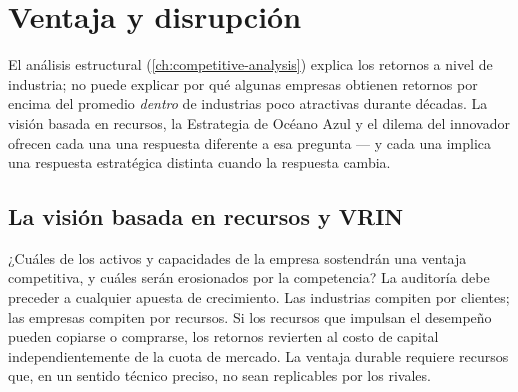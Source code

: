 \chapter{Ventaja y disrupción}\label{ch:advantage-and-disruption}


El análisis estructural (\cref{ch:competitive-analysis}) explica los retornos a nivel de industria;
no puede explicar por qué algunas empresas obtienen retornos por encima del promedio \emph{dentro}
de industrias poco atractivas durante décadas. La visión basada en recursos, la Estrategia de
Océano Azul y el dilema del innovador ofrecen cada una una respuesta diferente a esa pregunta
--- y cada una implica una respuesta estratégica distinta cuando la respuesta cambia.

\section{La visión basada en recursos y VRIN}\label{sec:rbv-vrin}

¿Cuáles de los activos y capacidades de la empresa sostendrán una ventaja competitiva, y cuáles
serán erosionados por la competencia? La auditoría debe preceder a cualquier apuesta de crecimiento.
Las industrias compiten por clientes; las empresas compiten por recursos. Si los recursos que
impulsan el desempeño pueden copiarse o comprarse, los retornos revierten al costo de capital
independientemente de la cuota de mercado. La ventaja durable requiere recursos que, en un
sentido técnico preciso, no sean replicables por los rivales.

